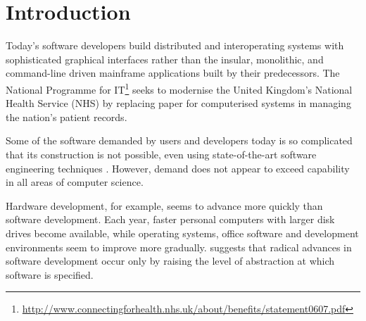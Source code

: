 

\chapter{Introduction}
\label{Introduction}
Today's software developers build distributed and interoperating systems with sophisticated graphical interfaces rather than the insular, monolithic, and command-line driven mainframe applications built by their predecessors. The National Programme for IT\footnote{\url{http://www.connectingforhealth.nhs.uk/about/benefits/statement0607.pdf}} seeks to modernise the United Kingdom's National Health Service (NHS) by replacing paper for computerised systems in managing the nation's patient records. 

Some of the software demanded by users and developers today is so complicated that its construction is not possible, even using state-of-the-art software engineering techniques \cite{selic03pragmatics}. However, demand does not appear to exceed capability in all areas of computer science.


Hardware development, for example, seems to advance more quickly than software development. Each year, faster personal computers with larger disk drives become available, while operating systems, office software and development environments seem to improve more gradually. \cite{brooks86nosilverbullet} suggests that radical advances in software development occur only by raising the level of abstraction at which software is specified.

%  

